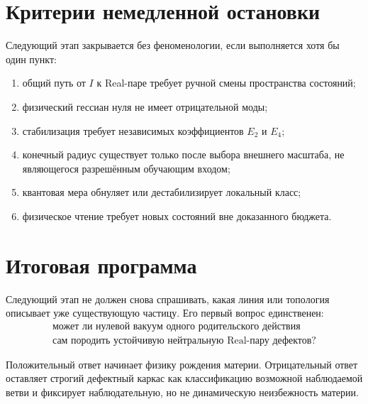 \section{Критерии немедленной остановки}

Следующий этап закрывается без феноменологии, если выполняется хотя бы один
пункт:
\begin{enumerate}
 \item общий путь от $I$ к Real-паре требует ручной смены пространства
 состояний;
 \item физический гессиан нуля не имеет отрицательной моды;
 \item стабилизация требует независимых коэффициентов $E_2$ и $E_4$;
 \item конечный радиус существует только после выбора внешнего масштаба,
 не являющегося разрешённым обучающим входом;
 \item квантовая мера обнуляет или дестабилизирует локальный класс;
 \item физическое чтение требует новых состояний вне доказанного бюджета.
\end{enumerate}

\section{Итоговая программа}

Следующий этап не должен снова спрашивать, какая линия или топология
описывает уже существующую частицу. Его первый вопрос единственен:
\begin{equation}
 \boxed{
 \begin{gathered}
 \text{может ли нулевой вакуум одного родительского действия}\\
 \text{сам породить устойчивую нейтральную Real-пару дефектов?}
 \end{gathered}}
 \label{eq:v5-final-next-question}
\end{equation}

Положительный ответ начинает физику рождения материи. Отрицательный ответ
оставляет строгий дефектный каркас как классификацию возможной
наблюдаемой ветви и фиксирует наблюдательную, но не динамическую
неизбежность материи.

